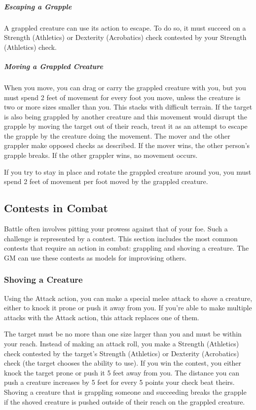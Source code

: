 \subparagraph*{Escaping a Grapple} A grappled creature can use its action to escape. To do so, it must succeed on a Strength (Athletics) or Dexterity (Acrobatics) check contested by your Strength
(Athletics) check.

\subparagraph*{Moving a Grappled Creature} When you move, you can drag or carry the grappled creature with you, but you must spend 2 feet of movement for every foot you move, unless the creature is two or more sizes smaller than you. This stacks with difficult terrain. If the target is also being grappled by another creature and this movement would disrupt the grapple by moving the target out of their reach, treat it as an attempt to escape the grapple by the creature doing the movement. The mover and the other grappler make opposed checks as described. If the mover wins, the other person's grapple breaks. If the other grappler wins, no movement occurs.

If you try to stay in place and rotate the grappled creature around you, you must spend 2 feet of movement per foot moved by the grappled creature.

\subsection{Contests in Combat}

Battle often involves pitting your prowess against that of your foe. Such a challenge is represented by a contest. This section includes the most common contests that require an action in combat: grappling and shoving a creature. The GM can use these contests as models for improvising others.

\subsubsection{Shoving a Creature}

Using the Attack action, you can make a special melee attack to shove a creature, either to knock it prone or push it away from you. If you're able to make multiple attacks with the Attack action, this attack replaces one of them.

The target must be no more than one size larger than you and must be within your reach. Instead of making an attack roll, you make a Strength (Athletics) check contested by the target's Strength (Athletics) or Dexterity (Acrobatics) check (the target chooses the ability to use). If you win the contest, you either knock the target prone or push it 5 feet away from you. The distance you can push a creature increases by 5 feet for every 5 points your check beat theirs. Shoving a creature that is grappling someone and succeeding breaks the grapple if the shoved creature is pushed outside of their reach on the grappled creature.

